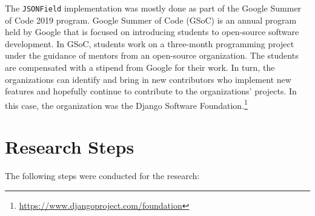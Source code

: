 The \verb|JSONField| implementation was mostly done as part of the Google
Summer of Code 2019 program. Google Summer of Code (GSoC) is an annual program
held by Google that is focused on introducing students to open-source software
development. In GSoC, students work on a three-month programming project under
the guidance of mentors from an open-source organization. The students are
compensated with a stipend from Google for their work. In turn, the
organizations can identify and bring in new contributors who implement new
features and hopefully continue to contribute to the organizations' projects.
In this case, the organization was the Django Software
Foundation.\footnote{\url{https://www.djangoproject.com/foundation}}

\section{Research Steps}

The following steps were conducted for the research:

